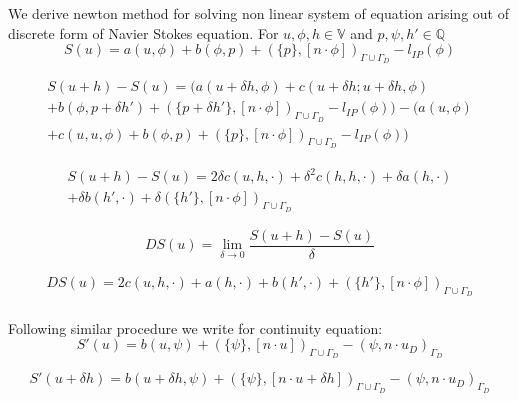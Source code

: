 \documentclass[a4paper,12pt]{book}
\begin{document}
We derive newton method for solving non linear system of equation arising out of discrete form of Navier Stokes equation. For $u, \phi , h \in \mathbb{V}$ and $p, \psi , h' \in \mathbb{Q}$ \\
\begin{equation}
S(u) = a(u,\phi) + b(\phi,p) + (\{p\},[n\cdot \phi])_{\Gamma \cup \Gamma_D} - l_{IP}(\phi)
\end{equation}


\begin{equation}
\begin{split}
S(u+h) - S(u) = (a(u+\delta h,\phi) + c(u + \delta h;u + \delta h,\phi)\\ + b(\phi,p+\delta h') + (\{p+\delta h'\},[n\cdot \phi])_{\Gamma \cup \Gamma_D} - l_{IP}(\phi)) - (a(u,\phi)\\ + c(u,u,\phi) + b(\phi,p) + (\{p\},[n\cdot \phi])_{\Gamma \cup \Gamma_D} - l_{IP}(\phi))
\end{split}
\end{equation}


\begin{equation}
\begin{split}
S(u+h) - S(u) = 2\delta c(u,h,\cdot) + \delta^2 c(h,h,\cdot) + \delta a(h,\cdot)\\ + \delta b(h',\cdot) + \delta (\{h'\},[n\cdot \phi])_{\Gamma \cup \Gamma_D}
\end{split}
\end{equation}


\begin{equation}
DS(u) = \lim_{\delta \to 0} \frac{S(u+h)-S(u)}{\delta}
\end{equation}

\begin{equation}
\begin{split}
DS(u) = 2 c(u,h,\cdot) + a(h,\cdot) + b(h',\cdot) + (\{h'\},[n\cdot \phi])_{\Gamma \cup \Gamma_D}
\end{split}
\end{equation}\\

Following similar procedure we write for continuity equation:\\
\begin{equation}
S'(u) = b(u,\psi) + (\{\psi\},[n \cdot u])_{\Gamma \cup \Gamma_D} - (\psi,n \cdot u_D)_{\Gamma_D}
\end{equation}

\begin{equation}
S'(u+\delta h) = b(u + \delta h,\psi) + (\{\psi\},[n \cdot u + \delta h])_{\Gamma \cup \Gamma_D} - (\psi,n \cdot u_D)_{\Gamma_D}
\end{equation}
\end{document}
